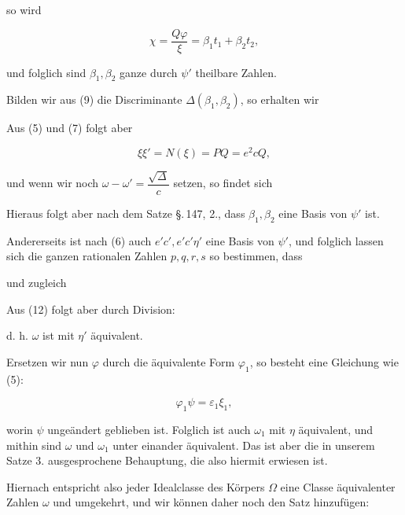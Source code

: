 
so wird

\[ \chi = \frac{Q\varphi}{\xi} = \beta_1t_1+\beta_2t_2, \]

und folglich sind $\beta_1,\beta_2$ ganze durch $\psi'$ theilbare Zahlen.

Bilden wir aus (9) die Discriminante $\varDelta(\beta_1,\beta_2)$, so erhalten wir


Aus (5) und (7) folgt aber

\[ \xi\xi' = N(\xi) = PQ = e^2cQ, \]

und wenn wir noch $\omega-\omega' = \dfrac{\sqrt{\varDelta}}{c}$ setzen, so findet sich


Hieraus folgt aber nach dem Satze \S.\,147, 2., dass $\beta_1,\beta_2$ eine Basis von $\psi'$ ist.

Andererseits ist nach (6) auch $e'c', e'c'\eta'$ eine Basis von $\psi'$, und folglich lassen sich die ganzen rationalen Zahlen $p,q,r,s$ so bestimmen, dass


und zugleich


Aus (12) folgt aber durch Division:


d. h. $\omega$ ist mit $\eta'$ äquivalent.

Ersetzen wir nun $\varphi$ durch die äquivalente Form $\varphi_1$, so besteht eine Gleichung wie (5):

\[ \varphi_1\psi = \varepsilon_1\xi_1, \]

worin $\psi$ ungeändert geblieben ist. Folglich ist auch $\omega_1$ mit $\eta$ äquivalent, und mithin sind $\omega$ und $\omega_1$ unter einander äquivalent. %
Das ist aber die in unserem Satze 3. ausgesprochene Behauptung, die also hiermit erwiesen ist.

Hiernach entspricht also jeder Idealclasse des Körpers $\Omega$ eine Classe äquivalenter Zahlen $\omega$ und umgekehrt, und wir können daher noch den Satz hinzufügen:
